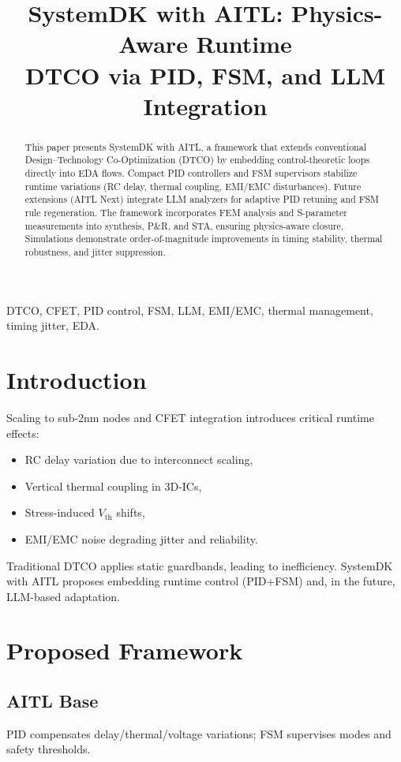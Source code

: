 \documentclass[conference]{IEEEtran}
\title{SystemDK with AITL: Physics-Aware Runtime\\
DTCO via PID, FSM, and LLM Integration}
\author{
  \IEEEauthorblockN{Shinichi Samizo}
  \IEEEauthorblockA{Independent Semiconductor Researcher\\
  Email: \href{mailto:shin3t72@gmail.com}{shin3t72@gmail.com}}
}
\begin{document}
\maketitle

\begin{abstract}
This paper presents SystemDK with AITL, a framework that extends conventional Design--Technology Co-Optimization (DTCO) by embedding control-theoretic loops directly into EDA flows. Compact PID controllers and FSM supervisors stabilize runtime variations (RC delay, thermal coupling, EMI/EMC disturbances). Future extensions (AITL Next) integrate LLM analyzers for adaptive PID retuning and FSM rule regeneration. The framework incorporates FEM analysis and S-parameter measurements into synthesis, P\&R, and STA, ensuring physics-aware closure. Simulations demonstrate order-of-magnitude improvements in timing stability, thermal robustness, and jitter suppression.
\end{abstract}

\begin{IEEEkeywords}
DTCO, CFET, PID control, FSM, LLM, EMI/EMC, thermal management, timing jitter, EDA.
\end{IEEEkeywords}

\section{Introduction}
Scaling to sub-2nm nodes and CFET integration introduces critical runtime effects:
\begin{itemize}
  \item RC delay variation due to interconnect scaling,
  \item Vertical thermal coupling in 3D-ICs,
  \item Stress-induced $V_{\text{th}}$ shifts,
  \item EMI/EMC noise degrading jitter and reliability.
\end{itemize}
Traditional DTCO applies static guardbands, leading to inefficiency. SystemDK with AITL proposes embedding runtime control (PID+FSM) and, in the future, LLM-based adaptation.

\section{Proposed Framework}

\subsection{AITL Base}
PID compensates delay/thermal/voltage variations; FSM supervises modes and safety thresholds.
\end{document}
